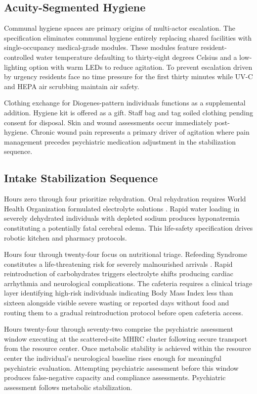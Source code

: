 \documentclass[12pt, letterpaper]{article}
\begin{document}
\subsection{Acuity-Segmented Hygiene}

Communal hygiene spaces are primary origins of multi-actor escalation. The specification eliminates communal hygiene entirely replacing shared facilities with single-occupancy medical-grade modules. These modules feature resident-controlled water temperature defaulting to thirty-eight degrees Celsius and a low-lighting option with warm LEDs to reduce agitation. To prevent escalation driven by urgency residents face no time pressure for the first thirty minutes while UV-C and HEPA air scrubbing maintain air safety.

Clothing exchange for Diogenes-pattern individuals functions as a supplemental addition. Hygiene kit is offered as a gift. Staff bag and tag soiled clothing pending consent for disposal. Skin and wound assessments occur immediately post-hygiene. Chronic wound pain represents a primary driver of agitation where pain management precedes psychiatric medication adjustment in the stabilization sequence.

\subsection{Intake Stabilization Sequence}

Hours zero through four prioritize rehydration. Oral rehydration requires World Health Organization formulated electrolyte solutions \citep{who_ors_2006}. Rapid water loading in severely dehydrated individuals with depleted sodium produces hyponatremia constituting a potentially fatal cerebral edema. This life-safety specification drives robotic kitchen and pharmacy protocols.

Hours four through twenty-four focus on nutritional triage. Refeeding Syndrome constitutes a life-threatening risk for severely malnourished arrivals \citep{refeeding_syndrome_2008}. Rapid reintroduction of carbohydrates triggers electrolyte shifts producing cardiac arrhythmia and neurological complications. The cafeteria requires a clinical triage layer identifying high-risk individuals indicating Body Mass Index less than sixteen alongside visible severe wasting or reported days without food and routing them to a gradual reintroduction protocol before open cafeteria access.

Hours twenty-four through seventy-two comprise the psychiatric assessment window executing at the scattered-site MHRC cluster following secure transport from the resource center. Once metabolic stability is achieved within the resource center the individual's neurological baseline rises enough for meaningful psychiatric evaluation. Attempting psychiatric assessment before this window produces false-negative capacity and compliance assessments. Psychiatric assessment follows metabolic stabilization.
\end{document}
